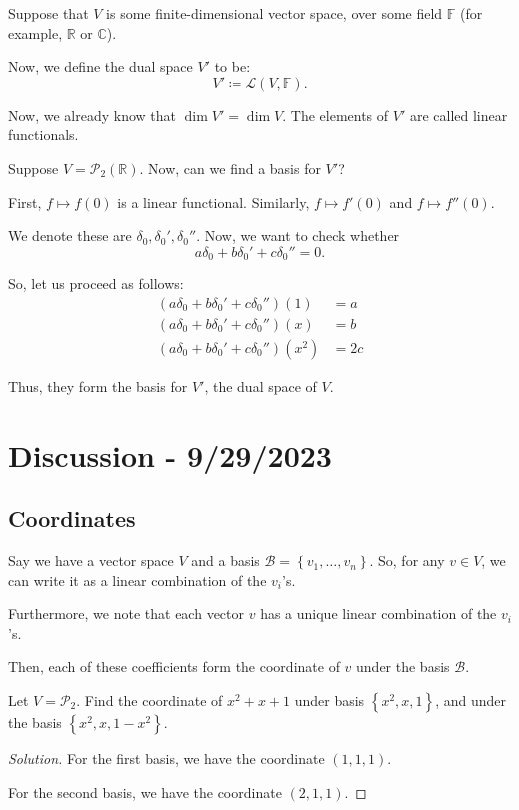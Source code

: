 \documentclass[openany]{book}
\newenvironment{solution}{\begin{proof}[Solution]}{\end{proof}}
\newcommand{\CC}{\mathbb{C}}
\newcommand{\RR}{\mathbb{R}}
\begin{document}
Suppose that $V$ is some finite-dimensional vector space, over some field $\mathbb{F}$ (for example, $\RR$ or $\CC$).

Now, we define the dual space $V'$ to be:
\begin{equation*}
	V' \coloneq \mathcal L(V, \mathbb{F}).
\end{equation*}

Now, we already know that $\dim V' = \dim V$. The elements of $V'$ are called linear functionals.

\begin{example}
	Suppose $V = \mathscr{P}_{2}(\RR)$. Now, can we find a basis for $V'$?
	
	First, $f \mapsto f(0)$ is a linear functional. Similarly, $f \mapsto f'(0)$ and $f \mapsto f''(0)$.
	
	We denote these are $\delta_0, \delta_{0}', \delta_0''$. Now, we want to check whether
	\begin{equation*}
		a\delta_0 + b \delta_0' + c \delta_0'' = 0.
	\end{equation*}

	So, let us proceed as follows:
	\begin{align*}
		(a\delta_0 + b \delta_0' + c \delta_0'')(1) &= a \\
		(a\delta_0 + b \delta_0' + c \delta_0'')(x) &= b \\
		(a\delta_0 + b \delta_0' + c \delta_0'')(x^{2}) &= 2c
	\end{align*}

	Thus, they form the basis for $V'$, the dual space of $V$.
\end{example}

\section{Discussion - 9/29/2023}
\subsection{Coordinates}
Say we have a vector space $V$ and a basis $\mathcal B = \left\{  v_{1}, \ldots, v_{n}\right\}$. So, for any $v \in V$, we can write it as a linear combination of the $v_{i}$'s.

Furthermore, we note that each vector $v$ has a unique linear combination of the $v_{i}$'s.

Then, each of these coefficients form the coordinate of $v$ under the basis $\mathcal B$.

\begin{hw}
	Let $V = \mathscr{P}_{2}$. Find the coordinate of $x^{2} + x + 1$ under basis $\left\{  x^{2}, x, 1\right\}$, and under the basis $\left\{  x^{2}, x, 1-x^{2} \right\}$. 
\end{hw}
\begin{solution}
	For the first basis, we have the coordinate $(1,1,1)$.
	
	For the second basis, we have the coordinate $(2, 1, 1)$.
\end{solution}
\end{document}

